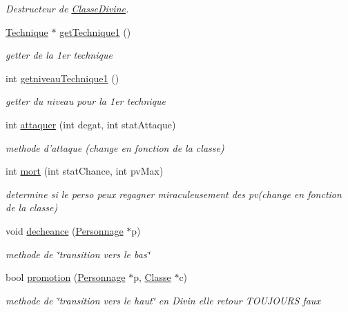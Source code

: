 \begin{DoxyCompactItemize}
\begin{DoxyCompactList}\small\item\em Destructeur de \hyperlink{classClasseDivine}{Classe\-Divine}. \end{DoxyCompactList}\item 
\hyperlink{classTechnique}{Technique} $\ast$ \hyperlink{classClasseDivine_ad5bf8bbab68ba8b0dc5c61f97b0f0190}{get\-Technique1} ()
\begin{DoxyCompactList}\small\item\em getter de la 1er technique \end{DoxyCompactList}\item 
int \hyperlink{classClasseDivine_a6d2e2f72884c04cb90582879665e8dc2}{getniveau\-Technique1} ()
\begin{DoxyCompactList}\small\item\em getter du niveau pour la 1er technique \end{DoxyCompactList}\item 
int \hyperlink{classClasseDivine_a91cef59fd50031801e64ceffa6b979ab}{attaquer} (int degat, int stat\-Attaque)
\begin{DoxyCompactList}\small\item\em methode d'attaque (change en fonction de la classe) \end{DoxyCompactList}\item 
int \hyperlink{classClasseDivine_af8a138f468768c9415325f4090cc24ab}{mort} (int stat\-Chance, int pv\-Max)
\begin{DoxyCompactList}\small\item\em determine si le perso peux regagner miraculeusement des pv(change en fonction de la classe) \end{DoxyCompactList}\item 
void \hyperlink{classClasseDivine_afe770976dc99f0d7b9a7ad53f4523741}{decheance} (\hyperlink{classPersonnage}{Personnage} $\ast$p)
\begin{DoxyCompactList}\small\item\em methode de \char`\"{}transition vers le bas\char`\"{} \end{DoxyCompactList}\item 
bool \hyperlink{classClasseDivine_aa0b67e83394449bf4eb49d2cba44ba19}{promotion} (\hyperlink{classPersonnage}{Personnage} $\ast$p, \hyperlink{classClasse}{Classe} $\ast$c)
\begin{DoxyCompactList}\small\item\em methode de \char`\"{}transition vers le haut\char`\"{} en Divin elle retour T\-O\-U\-J\-O\-U\-R\-S faux \end{DoxyCompactList}\end{DoxyCompactItemize}
